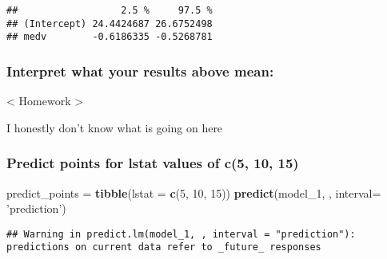 \documentclass[]{article}
\newenvironment{Shaded}{\begin{snugshade}}{\end{snugshade}}
\newcommand{\DataTypeTok}[1]{\textcolor[rgb]{0.13,0.29,0.53}{#1}}
\newcommand{\DecValTok}[1]{\textcolor[rgb]{0.00,0.00,0.81}{#1}}
\newcommand{\KeywordTok}[1]{\textcolor[rgb]{0.13,0.29,0.53}{\textbf{#1}}}
\newcommand{\NormalTok}[1]{#1}
\newcommand{\StringTok}[1]{\textcolor[rgb]{0.31,0.60,0.02}{#1}}
\begin{document}
\begin{verbatim}
##                  2.5 %     97.5 %
## (Intercept) 24.4424687 26.6752498
## medv        -0.6186335 -0.5268781
\end{verbatim}

\hypertarget{interpret-what-your-results-above-mean-1}{%
\subsubsection{Interpret what your results above
mean:}\label{interpret-what-your-results-above-mean-1}}

\textless{} Homework \textgreater{}

I honestly don't know what is going on here

\hypertarget{predict-points-for-lstat-values-of-c5-10-15}{%
\subsubsection{Predict points for lstat values of c(5, 10,
15)}\label{predict-points-for-lstat-values-of-c5-10-15}}

\begin{Shaded}
\begin{Highlighting}[]
\NormalTok{predict_points =}\StringTok{ }\KeywordTok{tibble}\NormalTok{(}\DataTypeTok{lstat =} \KeywordTok{c}\NormalTok{(}\DecValTok{5}\NormalTok{, }\DecValTok{10}\NormalTok{, }\DecValTok{15}\NormalTok{))}
\KeywordTok{predict}\NormalTok{(model_}\DecValTok{1}\NormalTok{,  , }\DataTypeTok{interval=} \StringTok{'prediction'}\NormalTok{)}
\end{Highlighting}
\end{Shaded}

\begin{verbatim}
## Warning in predict.lm(model_1, , interval = "prediction"): predictions on current data refer to _future_ responses
\end{verbatim}
\end{document}
